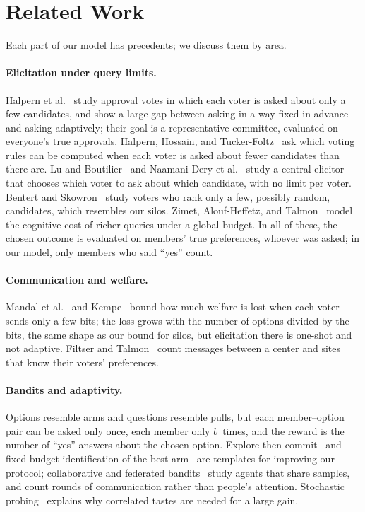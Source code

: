 \documentclass[11pt]{article}
\theoremstyle{definition}
\begin{document}
\section{Related Work}

Each part of our model has precedents; we discuss them by area.

\paragraph{Elicitation under query limits.}
Halpern et al.~\cite{halpern2023representation} study approval votes in which each voter is asked about only a few candidates, and show a large gap between asking in a way fixed in advance and asking adaptively; their goal is a representative committee, evaluated on everyone's true approvals.
Halpern, Hossain, and Tucker-Foltz~\cite{halpern2024computing} ask which voting rules can be computed when each voter is asked about fewer candidates than there are.
Lu and Boutilier~\cite{lu2011robust} and Naamani-Dery et al.~\cite{naamani2014reaching} study a central elicitor that chooses which voter to ask about which candidate, with no limit per voter.
Bentert and Skowron~\cite{bentert2019comparing} study voters who rank only a few, possibly random, candidates, which resembles our silos.
Zimet, Alouf-Heffetz, and Talmon~\cite{zimet2026query} model the cognitive cost of richer queries under a global budget.
In all of these, the chosen outcome is evaluated on members' true preferences, whoever was asked; in our model, only members who said ``yes'' count.

\paragraph{Communication and welfare.}
Mandal et al.~\cite{mandal2019thrifty,mandal2020optimal} and Kempe~\cite{kempe2019communication} bound how much welfare is lost when each voter sends only a few bits; the loss grows with the number of options divided by the bits, the same shape as our bound for silos, but elicitation there is one-shot and not adaptive.
Filtser and Talmon~\cite{filtser2019distributed} count messages between a center and sites that know their voters' preferences.

\paragraph{Bandits and adaptivity.}
Options resemble arms and questions resemble pulls, but each member--option pair can be asked only once, each member only $b$~times, and the reward is the number of ``yes'' answers about the chosen option.
Explore-then-commit~\cite{garivier2016etc} and fixed-budget identification of the best arm~\cite{karnin2013almost} are templates for improving our protocol; collaborative and federated bandits~\cite{hillel2013distributed,tao2019collaborative,shi2021federated} study agents that share samples, and count rounds of communication rather than people's attention.
Stochastic probing~\cite{gupta2016adaptivity} explains why correlated tastes are needed for a large gain.
\end{document}
